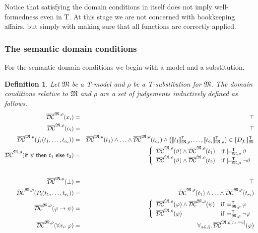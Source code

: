 \documentclass{article}
\newtheorem{definition}{Definition}[section]
\newcommand{\T}{\textsf T}
\newcommand{\ifthelse}[3]{\ensuremath{\mathsf{if}\ {#1}\ \mathsf{then}\ {#2}\ \mathsf{else}\ {#3}}}
\newcommand{\lang}[1]{\ensuremath{{\cal L}_{\mathsf{#1}}}}
\newcommand{\terms}[1]{\ensuremath{{\cal T}_{\mathsf{#1}}}}
\newcommand{\judg}[1]{\ensuremath{{\cal J}_{\mathsf{#1}}}}
\newcommand{\intm}[3]{\ensuremath{[\![{#3}]\!]^{\mathsf{#1}}_{\mathfrak{#2}}}}
\newcommand{\ints}[4]{\ensuremath{[\![{#4}]\!]^{\mathsf{#1}}_{\mathfrak{#2},{#3}}}}
\newcommand{\mymodelss}[3]{\ensuremath{\models_{\mathfrak{#2},{#3}}^{\mathsf{#1}}}}
\newcommand{\semDC}[2][{\mathfrak M},\rho]{\ensuremath{\overline{\cal{DC}}^{#1}_{#2}}}
\def\sep{.\,}
\begin{document}
Notice that satisfying the domain conditions in itself does not imply
well-formedness even in {\T}.  At this stage we are not concerned with
bookkeeping affairs, but simply with making sure that all functions are
correctly applied.

\subsubsection*{The semantic domain conditions}

For the semantic domain conditions we begin with a model and a substitution.

\begin{definition}\label{defn:semDCmodel}
Let $\mathfrak M$ be a {\T}-model and $\rho$ be a {\T}-substitution
for $\mathfrak M$.  The domain conditions relative to $\mathfrak M$
and $\rho$ are a set of judgements inductively defined as follows.
\begin{eqnarray*}
\semDC{}(x_i) & = & \top \\
\semDC{}(c_i) & = & \top \\
\semDC{}(f_i(t_1,\ldots,t_{a_i})) & = &
 \semDC{}(t_1)\wedge\ldots\wedge\semDC{}(t_{a_i})
 \wedge\left(\ints{T}M\rho{t_1},\ldots,\ints{T}M\rho{t_{a_i}}\right)\in
  \intm{T}M{D_{f_i}} \\
\semDC{}(\ifthelse{\vartheta}{t_1}{t_2}) & = &
 \left\{\begin{array}{ll}
  \semDC{}(\vartheta)\wedge\semDC{}(t_1) & \mbox{if $\mymodelss{T}M\rho\vartheta$}\\
  \semDC{}(\vartheta)\wedge\semDC{}(t_2) & \mbox{if $\mymodelss{T}M\rho\neg\vartheta$}
 \end{array}\right. \\
\\
\semDC{}(\bot) & = & \top \\
\semDC{}(P_i(t_1,\ldots,t_{r_i})) & = &
 \semDC{}(t_1)\wedge\ldots\wedge\semDC{}(t_{r_i})\\
\semDC{}(\varphi\to\psi) & = &
 \left\{\begin{array}{ll}
  \semDC{}(\varphi)\wedge\semDC{}(\psi) & \mbox{if $\mymodelss{T}M\rho\varphi$}\\
  \semDC{}(\varphi) & \mbox{if $\mymodelss{T}M\rho\neg\varphi$}
 \end{array}\right. \\
\semDC{}(\forall x_i\sep\varphi) & = &
 \forall_{a\in A}\sep\semDC[{\mathfrak M},{\rho[x_i:=a]}]{}(\varphi)
\end{eqnarray*}
\end{definition}
\end{document}
